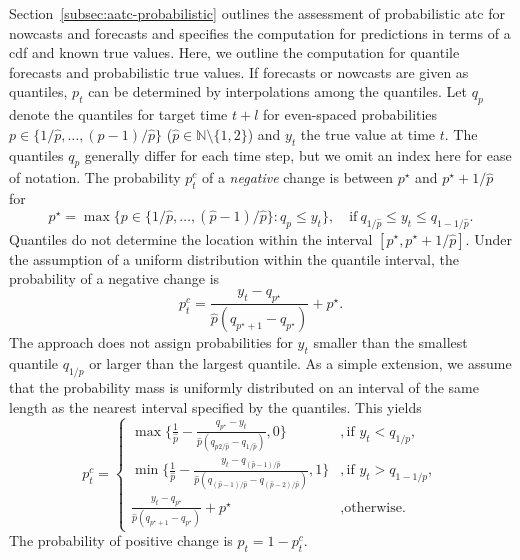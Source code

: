 \documentclass[pdflatex]{sn-jnl}
\theoremstyle{plain}%
\theoremstyle{definition}
\newcommand{\N}{\mathbb{N}}
\newcommand{\pmax}{\hat{p}} %
\newcommand{\pc}{p^c}
\begin{document}
Section~\ref{subsec:aatc-probabilistic} outlines the assessment of probabilistic \ac{atc} for nowcasts and forecasts and specifies the computation for predictions in terms of a \ac{cdf} and known true values.
Here, we outline the computation for quantile forecasts and probabilistic true values.
If forecasts or nowcasts are given as quantiles, $p_t$ can be determined by interpolations among the quantiles.
Let $q_p$ denote the quantiles for target time $t+l$ for even-spaced probabilities $p \in \{1/\pmax, \dots, (p-1) / \pmax\}$ ($\pmax \in \N \setminus \{1, 2\}$) and $y_t$ the true value at time $t$.
The quantiles $q_p$ generally differ for each time step, but we omit an index here for ease of notation.
The probability $\pc_t$ of a \textit{negative} change is between $p^{\star}$ and $p^{\star} + 1/\pmax$ for
\begin{equation*}
    p^{\star} = \max \{p \in \{1/\pmax, \dots, (\pmax-1) / \pmax\}: q_p \leq y_t\} , \quad \text{if}\ q_{1/\pmax} \leq y_t \leq q_{1 - 1/\pmax}.
\end{equation*}
Quantiles do not determine the location within the interval $[p^{\star}, p^{\star} + 1/\pmax]$.
Under the assumption of a uniform distribution within the quantile interval, the probability of a negative change is
\begin{equation*}
    \pc_t = \frac{y_t - q_{p^\star}}{\pmax (q_{p^{\star} + 1} - q_{p^{\star}})} + p^{\star}.
\end{equation*}
The approach does not assign probabilities for $y_t$ smaller than the smallest quantile $q_{1/p}$ or larger than the largest quantile.
As a simple extension, we assume that the probability mass is uniformly distributed on an interval of the same length as the nearest interval specified by the quantiles.
This yields
\begin{equation*}
\pc_t = \begin{cases}
    \max \{\frac{1}{\pmax} - \frac{q_{p^\star} - y_t}{\pmax (q_{p2/\pmax} - q_{1/\pmax})}, 0\} &, \text{if } y_t < q_{1/p}, \\
    \min \{\frac{1}{\pmax} - \frac{y_t - q_{(\pmax-1)/\pmax}}{\pmax (q_{(\pmax-1)/\pmax} - q_{(\pmax-2)/\pmax})}, 1\} &, \text{if } y_t > q_{1 - 1/p}, \\
    \frac{y_t - q_{p^\star}}{\pmax (q_{p^{\star} + 1} - q_{p^{\star}})} + p^{\star} &, \text{otherwise.}
\end{cases}
\end{equation*}
The probability of positive change is $p_t = 1 - \pc_t$.
\end{document}
